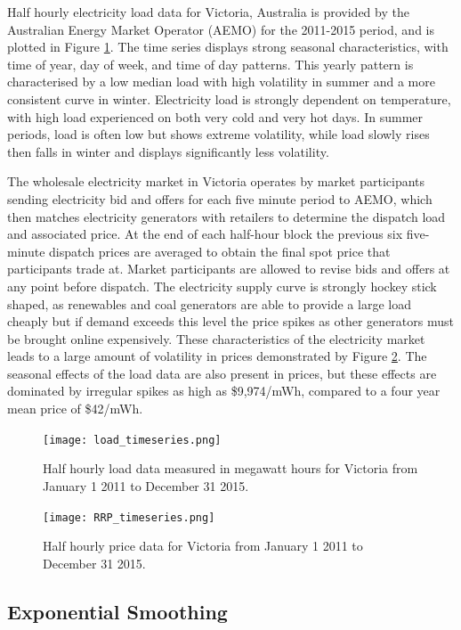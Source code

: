 \documentclass[12pt,a4paper]{article}%
\numberwithin{equation}{section}
\begin{document}
Half hourly electricity load data for Victoria, Australia is provided by the Australian Energy Market Operator (AEMO) for the 2011-2015 period, and is plotted in Figure \ref{fig:loadplot}. The time series displays strong seasonal characteristics, with time of year, day of week, and time of day patterns. This yearly pattern is characterised by a low median load with high volatility in summer and a more consistent curve in winter. Electricity load is strongly dependent on temperature, with high load experienced on both very cold and very hot days. In summer periods, load is often low but shows extreme volatility, while load slowly rises then falls in winter and displays significantly less volatility. 

The wholesale electricity market in Victoria operates by market participants sending electricity bid and offers for each five minute period to AEMO, which then matches electricity generators with retailers to determine the dispatch load and associated price. At the end of each half-hour block the previous six five-minute dispatch prices are averaged to obtain the final spot price that participants trade at. Market participants are allowed to revise bids and offers at any point before dispatch. The electricity supply curve is strongly hockey stick shaped, as renewables and coal generators are able to provide a large load cheaply but if demand exceeds this level the price spikes as other generators must be brought online expensively. These characteristics of the electricity market leads to a large amount of volatility in prices demonstrated by Figure \ref{fig:rrpplot}. The seasonal effects of the load data are also present in prices, but these effects are dominated by irregular spikes as high as \$9,974/mWh, compared to a four year mean price of \$42/mWh.

\begin{figure}[h]
\centering
\texttt{[image: load\_timeseries.png]}
\caption{Half hourly load data measured in megawatt hours for Victoria from January 1 2011 to December 31 2015.}
\label{fig:loadplot}
\end{figure}

\begin{figure}[h]
\centering
\texttt{[image: RRP\_timeseries.png]}
\caption{Half hourly price data for Victoria from January 1 2011 to December 31 2015.}
\label{fig:rrpplot}
\end{figure}

\subsection{Exponential Smoothing}
\end{document}
